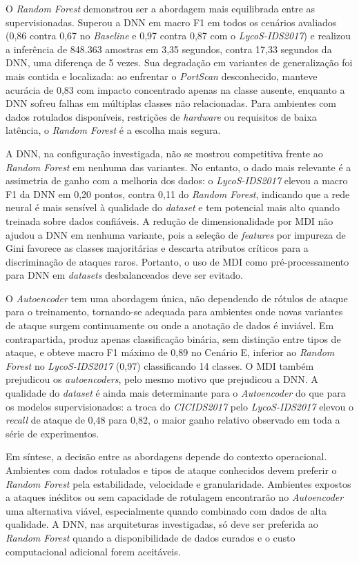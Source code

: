 O \textit{Random Forest} demonstrou ser a abordagem mais equilibrada entre as supervisionadas. Superou a DNN em macro F1 em todos os cenários avaliados (0,86 contra 0,67 no \textit{Baseline} e 0,97 contra 0,87 com o \textit{LycoS-IDS2017}) e realizou a inferência de 848.363 amostras em 3,35 segundos, contra 17,33 segundos da DNN, uma diferença de 5 vezes. Sua degradação em variantes de generalização foi mais contida e localizada: ao enfrentar o \textit{PortScan} desconhecido, manteve acurácia de 0,83 com impacto concentrado apenas na classe ausente, enquanto a DNN sofreu falhas em múltiplas classes não relacionadas. Para ambientes com dados rotulados disponíveis, restrições de \textit{hardware} ou requisitos de baixa latência, o \textit{Random Forest} é a escolha mais segura.

A DNN, na configuração investigada, não se mostrou competitiva frente ao \textit{Random Forest} em nenhuma das variantes. No entanto, o dado mais relevante é a assimetria de ganho com a melhoria dos dados: o \textit{LycoS-IDS2017} elevou a macro F1 da DNN em 0,20 pontos, contra 0,11 do \textit{Random Forest}, indicando que a rede neural é mais sensível à qualidade do \textit{dataset} e tem potencial mais alto quando treinada sobre dados confiáveis. A redução de dimensionalidade por MDI não ajudou a DNN em nenhuma variante, pois a seleção de \textit{features} por impureza de Gini favorece as classes majoritárias e descarta atributos críticos para a discriminação de ataques raros. Portanto, o uso de MDI como pré-processamento para DNN em \textit{datasets} desbalanceados deve ser evitado.

O \textit{Autoencoder} tem uma abordagem única, não dependendo de rótulos de ataque para o treinamento, tornando-se adequada para ambientes onde novas variantes de ataque surgem continuamente ou onde a anotação de dados é inviável. Em contrapartida, produz apenas classificação binária, sem distinção entre tipos de ataque, e obteve macro F1 máximo de 0,89 no Cenário E, inferior ao \textit{Random Forest} no \textit{LycoS-IDS2017} (0,97) classificando 14 classes. O MDI também prejudicou os \textit{autoencoders}, pelo mesmo motivo que prejudicou a DNN. A qualidade do \textit{dataset} é ainda mais determinante para o \textit{Autoencoder} do que para os modelos supervisionados: a troca do \textit{CICIDS2017} pelo \textit{LycoS-IDS2017} elevou o \textit{recall} de ataque de 0,48 para 0,82, o maior ganho relativo observado em toda a série de experimentos.

Em síntese, a decisão entre as abordagens depende do contexto operacional. Ambientes com dados rotulados e tipos de ataque conhecidos devem preferir o \textit{Random Forest} pela estabilidade, velocidade e granularidade. Ambientes expostos a ataques inéditos ou sem capacidade de rotulagem encontrarão no \textit{Autoencoder} uma alternativa viável, especialmente quando combinado com dados de alta qualidade. A DNN, nas arquiteturas investigadas, só deve ser preferida ao \textit{Random Forest} quando a disponibilidade de dados curados e o custo computacional adicional forem aceitáveis.

